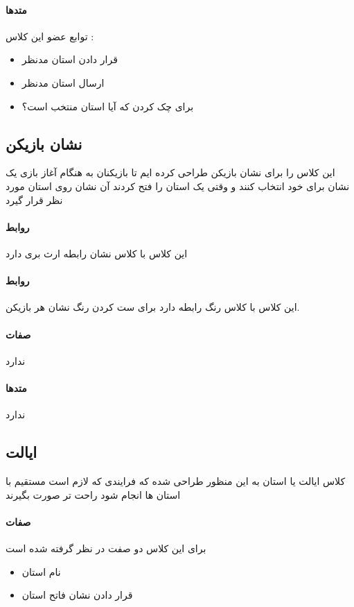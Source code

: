 \documentclass[pdf,titlepage,a4paper]{report}
\begin{document}
	\paragraph{متدها}
	 توابع عضو این کلاس :

	\begin{itemize}
		\item {} قرار دادن استان مدنظر
		\item {} ارسال استان مدنظر 
		\item {}برای چک کردن که آیا استان منتخب است؟
	\end{itemize}
	 
	\subsection{نشان بازیکن}
	این کلاس را برای نشان بازیکن طراحی کرده ایم تا بازیکنان به هنگام آغاز بازی یک نشان برای خود انتخاب کنند و وقتی یک استان را فتح کردند آن نشان روی استان مورد نظر قرار گیرد
	\paragraph{روابط}
	 این کلاس با کلاس نشان رابطه ارث بری دارد 
	\paragraph{روابط}
	این کلاس با کلاس رنگ رابطه دارد برای ست کردن رنگ نشان هر بازیکن.\\ 
	\paragraph{صفات}
	ندارد
	\paragraph{متدها}
	ندارد
	
	\subsection{ایالت}
	کلاس ایالت یا استان به این منظور طراحی شده که فرایندی که لازم است مستقیم با استان ها انجام شود راحت تر صورت بگیرند 

	\paragraph{صفات}
	 برای این کلاس دو صفت در نظر گرفته شده است
	 \begin{latin}
	 	\begin{itemize}
	 		\item {} نام استان 
	 		\item {} قرار دادن نشان فاتح استان
	 	\end{itemize}
	 \end{latin}
\end{document}
